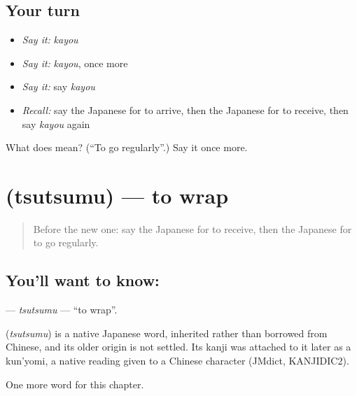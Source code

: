\subsection*{Your turn}
\begin{itemize}
\raggedright
  \item \emph{Say it:} \emph{kayou}
  \item \emph{Say it:} \emph{kayou}, once more
  \item \emph{Say it:} say \emph{kayou}
  \item \emph{Recall:} say the Japanese for to arrive, then the Japanese for to receive, then say \emph{kayou} again
\end{itemize}

\begin{tcolorbox}[breakable,colback=teal!4,colframe=teal!35!black,title={Before you move on}]
What does  mean? (\textquotedblleft{}To go regularly\textquotedblright{}.) Say it once more.
\end{tcolorbox}
\section[\texorpdfstring{\ja{つつむ} (tsutsumu)}{つつむ (tsutsumu)}]{ (tsutsumu) — to wrap}

\label{lesson:JA-C90-tsutsumu}



\begin{quote}
Before the new one: say the Japanese for to receive, then the Japanese for to go regularly.
\end{quote}

\subsection*{You'll want to know: }
\textbf{} — \emph{tsutsumu} — \textquotedblleft{}to wrap\textquotedblright{}.

\begin{cousinweb}
\textbf{} (\emph{tsutsumu}) is a native Japanese word, inherited rather than borrowed from Chinese, and its older origin is not settled. Its kanji was attached to it later as a kun'yomi, a native reading given to a Chinese character (JMdict, KANJIDIC2).
\end{cousinweb}

\begin{grammarlens}[title={What you've built}]
One more word for this chapter.
\end{grammarlens}

